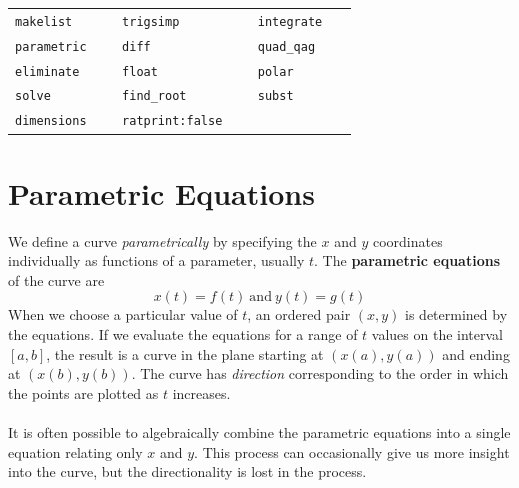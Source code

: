 \documentclass[10.5pt,twoside]{report}
\theoremstyle{definition}
\begin{document}
\minitoc

\vspace*{\fill}


\newline
\newline

\begin{tabular}{l l l}
 \verb|makelist   |   &\verb|trigsimp   |   &\verb|integrate   |   \\
 \verb|parametric   |   &\verb|diff   |   &\verb|quad_qag   |   \\
 \verb|eliminate   |   &\verb|float   |   &\verb|polar   |   \\
 \verb|solve   |   &\verb|find_root   |   &\verb|subst   |   \\
 \verb|dimensions   |   &\verb|ratprint:false   |   &\verb|   |   \\
\end{tabular}



\pagebreak
\section{Parametric Equations}\label{Parametric Equations}

We define a curve \textit{parametrically} by specifying the $x$ and $y$ coordinates individually as functions of a parameter, usually $t$.  The \textbf{parametric equations} of the curve are 
\[x(t)=f(t)\ \mathrm{ and }\ y(t)=g(t)\]
When we choose a particular value of $t$, an ordered pair $(x,y)$ is determined by the equations.  If we evaluate the equations for a range of $t$ values on the interval $[a,b]$, the result is a curve in the plane starting at $(x(a),y(a))$ and ending at $(x(b),y(b))$.  The curve has \textit{direction} corresponding to the order in which the points are plotted as $t$ increases.\\
${}$\\
It is often possible to algebraically combine the parametric equations into a single equation relating only $x$ and $y$.  This process can occasionally give us more insight into the curve, but the directionality is lost in the process. 

${}$\\
\end{document}
